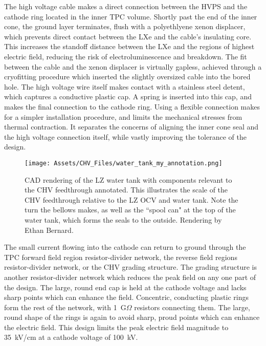 The high voltage cable  makes a direct connection between the HVPS and the cathode ring located in the inner TPC volume. 
Shortly past the end of the inner cone, the ground layer terminates, flush with a polyethlyene xenon displacer, which prevents direct contact between the LXe and the cable's insulating core.
This increases the standoff distance between the LXe and the regions of highest electric field, reducing the risk of electroluminescence and breakdown.
The fit between the cable and the xenon displacer is virtually gapless, achieved through a cryofitting procedure which inserted the slightly oversized cable into the bored hole.
The high voltage wire itself makes contact with a stainless steel detent, which captures a conductive plastic cap.
A spring is inserted into this cap, and makes the final connection to the cathode ring.
Using a flexible connection makes for a simpler installation procedure, and limits the mechanical stresses from thermal contraction.
It separates the concerns of aligning the inner cone seal and the high voltage connection itself, while vastly improving the tolerance of the design.
\begin{figure}
    \centering
    \texttt{[image: Assets/CHV\_Files/water\_tank\_my\_annotation.png]}
    \caption[CAD rendering of the LZ water tank with components relevant to the CHV feedthrough annotated.]%
    {
    CAD rendering of the LZ water tank with components relevant to the CHV feedthrough annotated.
    This illustrates the scale of the CHV feedthrough relative to the LZ OCV and water tank.
    Note the turn the bellows makes, as well as the ``spool can" at the top of the water tank, which forms the seals to the outside.
    Rendering by Ethan Bernard.
    }
    \label{fig:chv_water_tank}
\end{figure}


The small current flowing into the cathode can return to ground through the TPC forward field region resistor-divider network, the reverse field regions resistor-divider network, or the CHV grading structure.
The grading structure is another resistor-divider network which reduces the peak field on any one part of the design. 
The large, round end cap is held at the cathode voltage and lacks sharp points which can enhance the field.
Concentric, conducting plastic rings form the rest of the network, with 1~G$\Omega$ resistors connecting them.
The large, round shape of the rings is again to avoid sharp, proud points which can enhance the electric field.
This design limits the peak electric field magnitude to 35~kV/cm at a cathode voltage of 100~kV.


